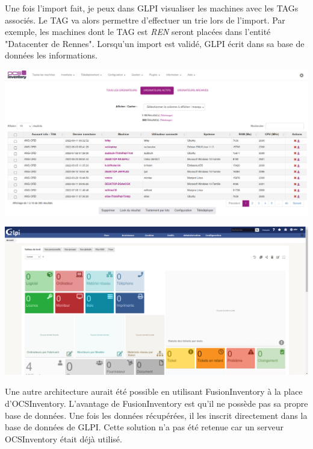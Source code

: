 \documentclass[12pt]{article}
\begin{document}
Une fois l'import fait, je peux dans GLPI visualiser les machines avec les TAGs associés. 
Le TAG va alors permettre d'effectuer un trie lors de l'import. 
Par exemple, les machines dont le TAG est \textit{REN} seront placées dans l'entité "Datacenter de Rennes".
Lorsqu'un import est validé, GLPI écrit dans sa base de données les informations. \\

\noindent%
\begin{minipage}{.5\textwidth}%
\begin{center}
\includegraphics[width=\textwidth]{src/interface_ocsinventory.png} \\
\end{center}
\end{minipage}%
\hfill
\begin{minipage}{.5\textwidth}%
\begin{center}
\includegraphics[width=\textwidth]{src/interface_glpi.png} \\
\end{center}
\end{minipage}%

Une autre architecture aurait été possible en utilisant FusionInventory à la place d'OCSInventory. 
L'avantage de FusionInventory est qu'il ne possède pas sa propre base de données. 
Une fois les données récupérées, il les inscrit directement dans la base de données de GLPI. 
Cette solution n'a pas été retenue car un serveur OCSInventory était déjà utilisé.
\end{document}
